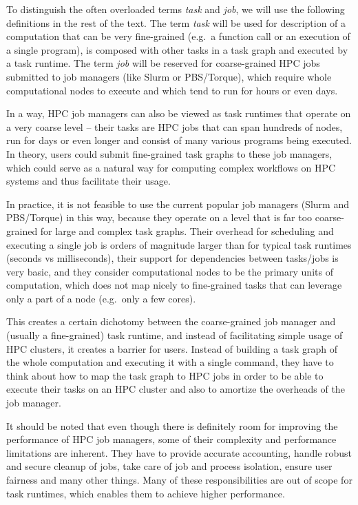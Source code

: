To distinguish the often overloaded terms \emph{task} and \emph{job}, we will use the following
definitions in the rest of the text. The term \emph{task} will be used for description of a
computation that can be very fine-grained (e.g.\ a function call or an execution of a single
program), is composed with other tasks in a task graph and executed by a task runtime. The term
\emph{job} will be reserved for coarse-grained HPC jobs submitted to job managers (like Slurm or
PBS/Torque), which require whole computational nodes to execute and which tend to run for hours
or even days.

In a way, HPC job managers can also be viewed as task runtimes that operate on a very coarse
level -- their tasks are HPC jobs that can span hundreds of nodes, run for days or even longer and
consist of many various programs being executed. In theory, users could submit fine-grained task
graphs to these job managers, which could serve as a natural way for computing complex workflows on
HPC systems and thus facilitate their usage.

In practice, it is not feasible to use the current popular job managers (Slurm and PBS/Torque) in
this way, because they operate on a level that is far too coarse-grained for large and complex task
graphs. Their overhead for scheduling and executing a single job is orders of magnitude larger
than for typical task runtimes (seconds vs milliseconds), their support for dependencies between
tasks/jobs is very basic, and they consider computational nodes to be the primary units of
computation, which does not map nicely to fine-grained tasks that can leverage only a part of a
node (e.g.\ only a few cores).

This creates a certain dichotomy between the coarse-grained job manager and (usually a
fine-grained) task runtime, and instead of facilitating simple usage of HPC clusters, it creates a
barrier for users. Instead of building a task graph of the whole computation and executing it with
a single command, they have to think about how to map the task graph to HPC jobs in order to be
able to execute their tasks on an HPC cluster and also to amortize the overheads of the job
manager.

It should be noted that even though there is definitely room for improving the performance of
HPC job managers, some of their complexity and performance limitations are inherent. They have
to provide accurate accounting, handle robust and secure cleanup of jobs, take care of job and
process isolation, ensure user fairness and many other things. Many of these responsibilities are
out of scope for task runtimes, which enables them to achieve higher performance.

